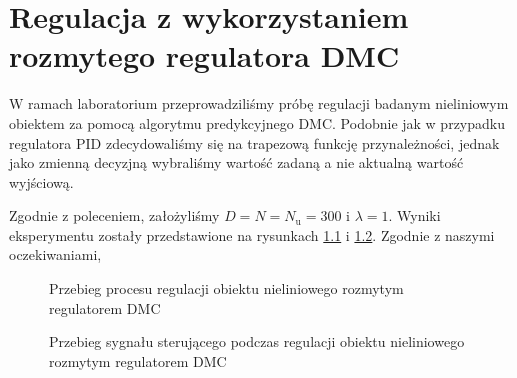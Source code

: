 \chapter{Regulacja z wykorzystaniem rozmytego regulatora DMC}
\label{lab5i6}

W ramach laboratorium przeprowadziliśmy próbę regulacji badanym 
nieliniowym obiektem za pomocą algorytmu predykcyjnego DMC. Podobnie jak w przypadku 
regulatora PID zdecydowaliśmy się na trapezową funkcję przynależności, jednak jako zmienną 
decyzjną wybraliśmy wartość zadaną a nie aktualną wartość wyjściową. 

Zgodnie z poleceniem, założyliśmy $D = N = N_{\mathrm{u}} = 300$ i $\lambda = 1$.
Wyniki eksperymentu zostały przedstawione na rysunkach \ref{dr_1_y} i \ref{dr_1_u}.
Zgodnie z naszymi oczekiwaniami,

\begin{figure}[t]
    \centering
    \caption{Przebieg procesu regulacji obiektu nieliniowego rozmytym regulatorem DMC}
    \label{dr_1_y}
\end{figure}

\begin{figure}[b]
    \centering
    \caption{Przebieg sygnału sterującego podczas regulacji obiektu nieliniowego rozmytym regulatorem DMC}
    \label{dr_1_u}
\end{figure}
\FloatBarrier

